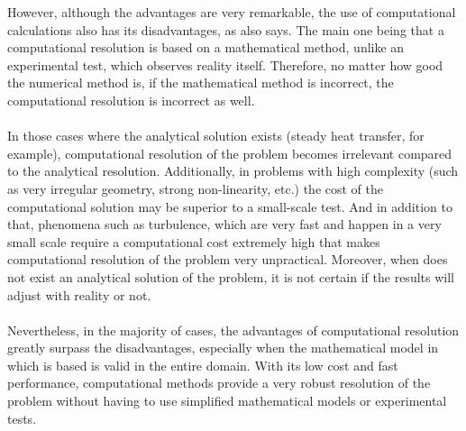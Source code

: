 However, although the advantages are very remarkable, the use of computational calculations also has its disadvantages, as \cite{Patankar} also says. The main one being that a computational resolution is based on a mathematical method, unlike an experimental test, which observes reality itself. Therefore, no matter how good the numerical method is, if the mathematical method is incorrect, the computational resolution is incorrect as well.\\
\\
In those cases where the analytical solution exists (steady heat transfer, for example), computational resolution of the problem becomes irrelevant compared to the analytical resolution. Additionally, in problems with high complexity (such as very irregular geometry, strong non-linearity, etc.) the cost of the computational solution may be superior to a small-scale test. And in addition to that, phenomena such as turbulence, which are very fast and happen in a very small scale require a computational cost extremely high that makes computational resolution of the problem very unpractical. Moreover, when does not exist an analytical solution of the problem, it is not certain if the results will adjust with reality or not.\\
\\
Nevertheless, in the majority of cases, the advantages of computational resolution greatly surpass the disadvantages, especially when the mathematical model in which is based is valid in the entire domain. With its low cost and fast performance, computational methods provide a very robust resolution of the problem without having to use simplified mathematical models or experimental tests.
\pagebreak
